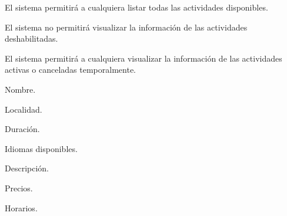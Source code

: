 \begin{enumitem}[label=\bfseries{RLis \arabic*.},leftmargin=*,]
	\item El sistema permitirá a cualquiera listar todas las actividades disponibles.
	\item El sistema no permitirá visualizar la información de las actividades deshabilitadas.
	\item El sistema permitirá a cualquiera visualizar la información de las actividades activas o canceladas temporalmente.
	\begin{enumitem}[label*=\bfseries{\arabic*.}]
		\item Nombre.
		\item Localidad.
		\item Duración.
		\item Idiomas disponibles.
		\item Descripción.
		\item Precios.
		\item Horarios.
	\end{enumitem}
\end{enumitem}
